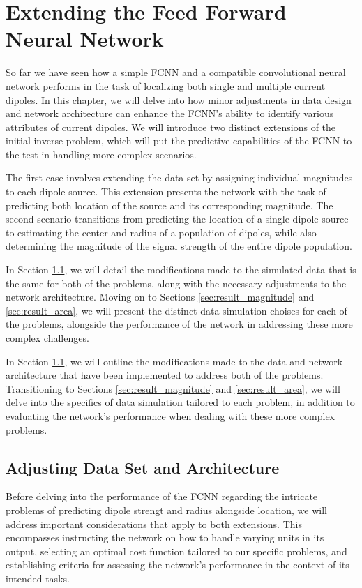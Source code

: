 \documentclass[a4paper, UKenglish, 11pt]{uiomaster}
\begin{document}
\chapter{Extending the Feed Forward Neural Network} \label{chap:extended_FFNN}
So far we have seen how a simple FCNN and a compatible convolutional neural network performs in the task of localizing both single and multiple current dipoles. In this chapter, we will delve into how minor adjustments in data design and network architecture can enhance the FCNN's ability to identify various attributes of current dipoles. We will introduce two distinct extensions of the initial inverse problem, which will put the predictive capabilities of the FCNN to the test in handling more complex scenarios.

The first case involves extending the data set by assigning individual magnitudes to each dipole source. This extension presents the network with the task of predicting both location of the source and its corresponding magnitude. The second scenario transitions from predicting the location of a single dipole source to estimating the center and radius of a population of dipoles, while also determining the magnitude of the signal strength of the entire dipole population.

In Section \ref{sec:method}, we will detail the modifications made to the simulated data that is the same for both of the problems, along with the necessary adjustments to the network architecture. Moving on to Sections \ref{sec:result_magnitude} and \ref{sec:result_area}, we will present the distinct data simulation choises for each of the problems, alongside the performance of the network in addressing these more complex challenges.

In Section \ref{sec:method}, we will outline the modifications made to the data and network architecture that have been implemented to address both of the problems. Transitioning to Sections \ref{sec:result_magnitude} and \ref{sec:result_area}, we will delve into the specifics of data simulation tailored to each problem, in addition to evaluating the network's performance when dealing with these more complex problems.


\section{Adjusting Data Set and Architecture} \label{sec:method}
Before delving into the performance of the FCNN regarding the intricate problems of predicting dipole strengt and radius alongside location, we will address important considerations that apply to both extensions. This encompasses instructing the network on how to handle varying units in its output, selecting an optimal cost function tailored to our specific problems, and establishing criteria for assessing the network's performance in the context of its intended tasks.
\end{document}
